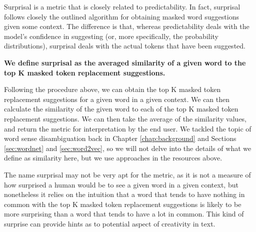 Surprisal is a metric that is closely related to predictability. In fact, surprisal follows closely the outlined algorithm for obtaining masked word suggestions given some context. The difference is that, whereas predictability deals with the model's confidence in suggesting (or, more specifically, the probability distributions), surprisal deals with the actual tokens that have been suggested. 

\textbf{We define surprisal as the averaged similarity of a given word to the top K masked token replacement suggestions.} 

Following the procedure above, we can obtain the top K masked token replacement suggestions for a given word in a given context. We can then calculate the similarity of the given word to each of the top K masked token replacement suggestions. We can then take the average of the similarity values, and return the metric for interpretation by the end user. We tackled the topic of word sense disambiguation back in Chapter \ref{chap:background} and Sections \ref{sec:wordnet} and \ref{sec:word2vec}, so we will not delve into the details of what we define as similarity here, but we use approaches in the resources above.

The name surprisal may not be very apt for the metric, as it is not a measure of how surprised a human would be to see a given word in a given context, but nonetheless it relies on the intuition that a word that tends to have nothing in common with the top K masked token replacement suggestions is likely to be more surprising than a word that tends to have a lot in common. This kind of surprise can provide hints as to potential aspect of creativity in text.
